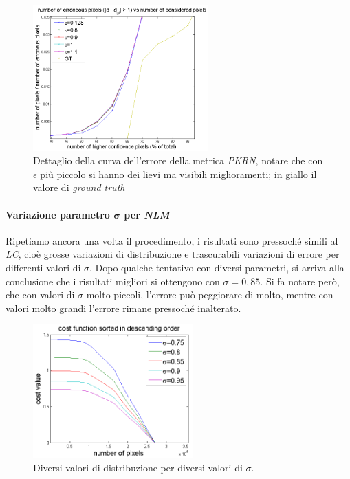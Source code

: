 \documentclass[12pt]{report}
\begin{document}
				\begin{figure}[H]
					\centering
					\includegraphics[width=0.6\textwidth]{./figures/epsilon_PKRN.png}
					\caption{Dettaglio della curva dell'errore della metrica \textit{PKRN}, notare che con $\epsilon$ più piccolo si hanno dei lievi ma visibili miglioramenti; in giallo il valore di \textit{ground truth}}
					\label{fig:epsilonPKRN}
				\end{figure} 
			
	
			\paragraph{Variazione parametro $\bm{\sigma}$ per \textit{NLM}}
			\label{par:sigmaNLM}
			
				Ripetiamo ancora una volta il procedimento, i risultati sono pressoché simili al \textit{LC}, cioè grosse variazioni di distribuzione e trascurabili variazioni di errore per differenti valori di $\sigma$. Dopo qualche tentativo con diversi parametri, si arriva alla conclusione che i risultati migliori si ottengono con $\sigma=0,85$. Si fa notare però, che con valori di $\sigma$ molto piccoli, l'errore può peggiorare di molto, mentre con valori molto grandi l'errore rimane pressoché inalterato.
							
				\begin{figure}
					\centering
					\includegraphics[width=0.55\textwidth]{./figures/sigma_NLM.png}
					\caption{Diversi valori di distribuzione per diversi valori di $\sigma$.}
					\label{fig:sigmaNLM}
				\end{figure} 
			
\end{document}

